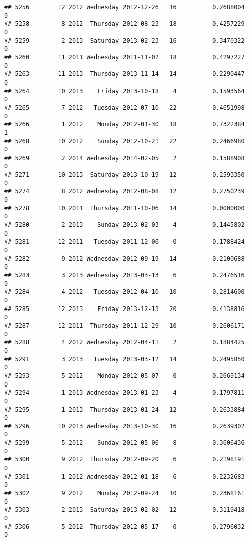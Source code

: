 \documentclass[
]{article}
\begin{document}
\begin{verbatim}
## 5256        12 2012 Wednesday 2012-12-26   16          0.2688004             0
## 5258         8 2012  Thursday 2012-08-23   18          0.4257229             0
## 5259         2 2013  Saturday 2013-02-23   16          0.3470322             0
## 5260        11 2011 Wednesday 2011-11-02   18          0.4297227             0
## 5263        11 2013  Thursday 2013-11-14   14          0.2290447             0
## 5264        10 2013    Friday 2013-10-18    4          0.1593564             0
## 5265         7 2012   Tuesday 2012-07-10   22          0.4651998             0
## 5266         1 2012    Monday 2012-01-30   18          0.7322384             1
## 5268        10 2012    Sunday 2012-10-21   22          0.2466980             0
## 5269         2 2014 Wednesday 2014-02-05    2          0.1588908             0
## 5271        10 2013  Saturday 2013-10-19   12          0.2593350             0
## 5274         8 2012 Wednesday 2012-08-08   12          0.2750239             0
## 5278        10 2011  Thursday 2011-10-06   14          0.0000000             0
## 5280         2 2013    Sunday 2013-02-03    4          0.1445802             0
## 5281        12 2011   Tuesday 2011-12-06    0          0.1788424             0
## 5282         9 2012 Wednesday 2012-09-19   14          0.2100688             0
## 5283         3 2013 Wednesday 2013-03-13    6          0.2476516             0
## 5284         4 2012   Tuesday 2012-04-10   10          0.2814600             0
## 5285        12 2013    Friday 2013-12-13   20          0.4138816             0
## 5287        12 2011  Thursday 2011-12-29   10          0.2606171             0
## 5288         4 2012 Wednesday 2012-04-11    2          0.1884425             0
## 5291         3 2013   Tuesday 2013-03-12   14          0.2495850             0
## 5293         5 2012    Monday 2012-05-07    0          0.2669134             0
## 5294         1 2013 Wednesday 2013-01-23    4          0.1797811             0
## 5295         1 2013  Thursday 2013-01-24   12          0.2633884             0
## 5296        10 2013 Wednesday 2013-10-30   16          0.2639302             0
## 5299         5 2012    Sunday 2012-05-06    8          0.3606436             0
## 5300         9 2012  Thursday 2012-09-20    6          0.2198191             0
## 5301         1 2012 Wednesday 2012-01-18    6          0.2232683             0
## 5302         9 2012    Monday 2012-09-24   10          0.2368161             0
## 5303         2 2013  Saturday 2013-02-02   12          0.3119418             0
## 5306         5 2012  Thursday 2012-05-17    0          0.2796032             0

\end{verbatim}
\end{document}
